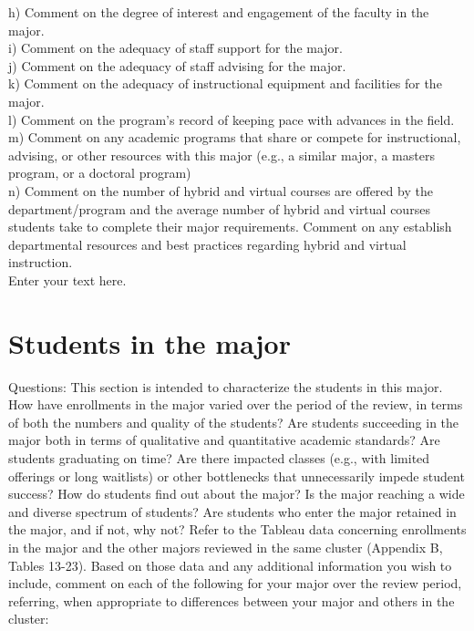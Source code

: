\documentclass[12pt]{article}
\begin{document}
    h) Comment on the degree of interest and engagement of the faculty in the major.\\
    i) Comment on the adequacy of staff support for the major.\\
    j) Comment on the adequacy of staff advising for the major.\\
    k) Comment on the adequacy of instructional equipment and facilities for the major.\\
    l) Comment on the program’s record of keeping pace with advances in the field.\\
    m) Comment on any academic programs that share or compete for instructional, advising, or other resources with this major (e.g., a similar major, a masters program, or a doctoral program)\\
    n) Comment on the number of hybrid and virtual courses are offered by the department/program and the average number of hybrid and virtual courses students take to complete their major requirements. Comment on any establish departmental resources and best practices regarding hybrid and virtual instruction.\\

Enter your text here.


\section{Students in the major}
Questions: This section is intended to characterize the students in this major. How have enrollments in the major varied over the period of the review, in terms of both the numbers and quality of the students? Are students succeeding in the major both in terms of qualitative and quantitative academic standards? Are students graduating on time? Are there impacted classes (e.g., with limited offerings or long waitlists) or other bottlenecks that unnecessarily impede student success? How do students find out about the major?  Is the major reaching a wide and diverse spectrum of students? Are students who enter the major retained in the major, and if not, why not?
Refer to the Tableau data concerning enrollments in the major and the other majors reviewed in the same cluster (Appendix B, Tables 13-23). Based on those data and any additional information you wish to include, comment on each of the following for your major over the review period, referring, when appropriate to differences between your major and others in the cluster:
\end{document}
